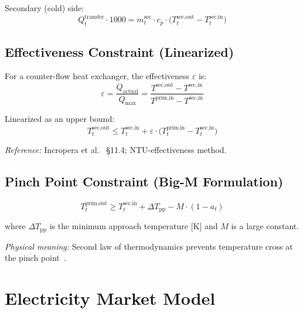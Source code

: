 \documentclass[a4paper,12pt]{article}
\begin{document}
\noindent Secondary (cold) side:
\begin{equation}
  Q^{\text{transfer}}_{t} \cdot 1000
  = \dot{m}^{\text{sec}}_{t} \cdot c_p
    \cdot \bigl(T^{\text{sec,out}}_{t} - T^{\text{sec,in}}_{t}\bigr)
  \tag{HX-2}
  \label{eq:hx2}
\end{equation}

\subsection{Effectiveness Constraint (Linearized)}

For a counter-flow heat exchanger, the effectiveness $\varepsilon$ is:
\[
  \varepsilon
  = \frac{Q_{\text{actual}}}{Q_{\text{max}}}
  = \frac{T^{\text{sec,out}} - T^{\text{sec,in}}}{T^{\text{prim,in}} - T^{\text{sec,in}}}
\]

Linearized as an upper bound:
\begin{equation}
  T^{\text{sec,out}}_{t}
  \leq T^{\text{sec,in}}_{t}
       + \varepsilon \cdot \bigl(T^{\text{prim,in}}_{t} - T^{\text{sec,in}}_{t}\bigr)
  \tag{HX-3}
  \label{eq:hx3}
\end{equation}

\noindent\textit{Reference:} Incropera et al.~\cite{Incropera2017} \S11.4; NTU-effectiveness
method.

\subsection{Pinch Point Constraint (Big-M Formulation)}

\begin{equation}
  T^{\text{prim,out}}_{t}
  \geq T^{\text{sec,in}}_{t} + \Delta T_{\text{pp}}
       - M \cdot (1 - a_{t})
  \tag{HX-4}
  \label{eq:hx4}
\end{equation}

where $\Delta T_{\text{pp}}$ is the minimum approach temperature [K] and $M$ is a large
constant.

\noindent\textit{Physical meaning:} Second law of thermodynamics prevents temperature cross at
the pinch point~\cite{Incropera2017}.

\section{Electricity Market Model}
\label{sec:elmarket}
\end{document}
